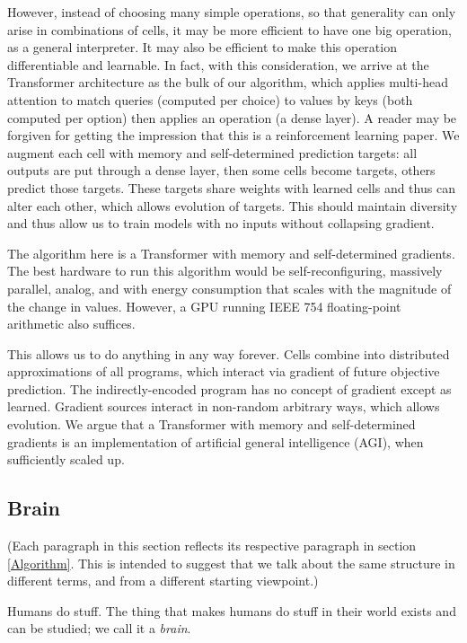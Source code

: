 \documentclass{article}
\begin{document}
However, instead of choosing many simple operations, so that generality can only arise in combinations of cells, it may be more efficient to have one big operation, as a general interpreter. It may also be efficient to make this operation differentiable and learnable. In fact, with this consideration, we arrive at the Transformer architecture \cite{vaswani2017attention} as the bulk of our algorithm, which applies multi-head attention to match queries (computed per choice) to values by keys (both computed per option) then applies an operation (a dense layer). A reader may be forgiven for getting the impression that this is a reinforcement learning paper. We augment each cell with memory and self-determined prediction targets: all outputs are put through a dense layer, then some cells become targets, others predict those targets. These targets share weights with learned cells and thus can alter each other, which allows evolution of targets. This should maintain diversity and thus allow us to train models with no inputs without collapsing gradient.

The algorithm here is a Transformer with memory and self-determined gradients. The best hardware to run this algorithm would be self-reconfiguring, massively parallel, analog, and with energy consumption that scales with the magnitude of the change in values. However, a GPU running IEEE 754 floating-point arithmetic also suffices.

This allows us to do anything in any way forever. Cells combine into distributed approximations of all programs, which interact via gradient of future objective prediction. The indirectly-encoded program has no concept of gradient except as learned. Gradient sources interact in non-random arbitrary ways, which allows evolution. We argue that a Transformer with memory and self-determined gradients is an implementation of artificial general intelligence (AGI), when sufficiently scaled up.

\subsection{Brain}

(Each paragraph in this section reflects its respective paragraph in section \ref{Algorithm}. This is intended to suggest that we talk about the same structure in different terms, and from a different starting viewpoint.)

Humans do stuff. The thing that makes humans do stuff in their world exists and can be studied; we call it a \textit{brain}.
\end{document}
